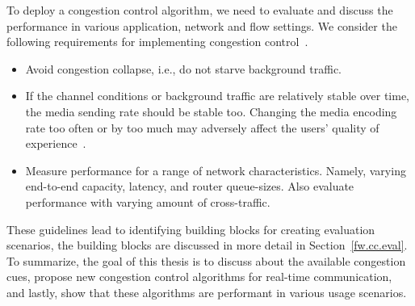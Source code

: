 


To deploy a congestion control algorithm, we need to evaluate and discuss the
performance in various application, network and flow settings. We consider the
following requirements for implementing congestion
control~\cite{draft.rmcat.evaluate}.

\begin{itemize}
\setlength{\itemsep}{0pt}

\item Avoid congestion collapse, i.e., do not starve background traffic.

\item If the channel conditions or background traffic are relatively stable
over time, the media sending rate should be stable too. Changing the media
encoding rate too often or by too much may adversely affect the users' quality
of experience~\cite{Zink03subjectiveimpression}.

\item Measure performance for a range of network characteristics. Namely,
varying end-to-end capacity, latency, and router queue-sizes. Also evaluate
performance with varying amount of cross-traffic.


\end{itemize}

These guidelines lead to identifying building blocks for creating evaluation
scenarios, the building blocks are discussed in more detail in
Section~\ref{fw.cc.eval}. To summarize, the goal of this thesis is to discuss
about the available congestion cues, propose new congestion control algorithms
for real-time communication, and lastly, show that these algorithms are
performant in various usage scenarios.


